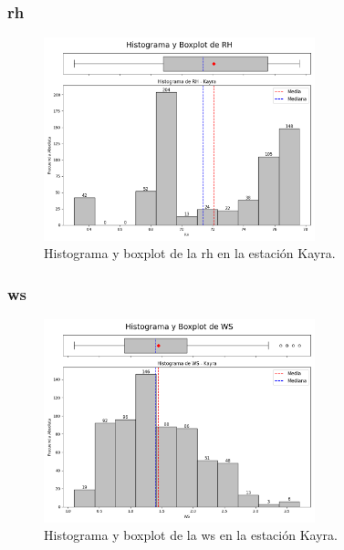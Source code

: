 \subsubsection*{\gls{rh} }
\begin{figure}[htbp]
\centering
\includegraphics[width=0.7\textwidth]{resultados/por_estacion_meteorologica/Kayra/RH_histograma.png}
\caption{Histograma y boxplot de la \gls{rh}  en la estación Kayra.}
\label{fig:kayra_RH}
\end{figure}

\subsubsection*{\gls{ws} }
\begin{figure}[htbp]
\centering
\includegraphics[width=0.7\textwidth]{resultados/por_estacion_meteorologica/Kayra/WS_histograma.png}
\caption{Histograma y boxplot de la \gls{ws}  en la estación Kayra.}
\label{fig:kayra_WS}
\end{figure}

